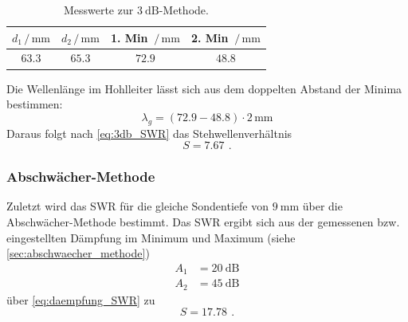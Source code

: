 \begin{table}
    \centering
    \caption{Messwerte zur $\SI{3}{\dB}$-Methode.}
    \label{tab:3db_methode}
    \begin{tabular}{c c c c}
        \toprule
        $d_1 \,/\, \si{\milli\metre}$ & $d_2 \,/\, \si{\milli\metre}$ & 1. Min $\,/\, \si{\milli\metre}$ & 2. Min $\,/\, \si{\milli\metre}$ \\
        \midrule
        $63.3$ & $65.3$ & $72.9$ & $48.8$ \\
        \bottomrule
    \end{tabular}
\end{table}
\FloatBarrier

Die Wellenlänge im Hohlleiter lässt sich aus dem doppelten Abstand der Minima bestimmen:
\begin{equation*}
    \lambda_g = (72.9 - 48.8) \cdot 2 \, \si{\milli\metre}
\end{equation*}
Daraus folgt nach \autoref{eq:3db_SWR} das Stehwellenverhältnis
\begin{equation}
    S = \SI{7.67}{} \, .
\end{equation}

\subsubsection{Abschwächer-Methode}
Zuletzt wird das SWR für die gleiche Sondentiefe von $\SI{9}{\milli\metre}$ über die Abschwächer-Methode bestimmt.
Das SWR ergibt sich aus der gemessenen bzw. eingestellten Dämpfung im Minimum und Maximum (siehe \autoref{sec:abschwaecher_methode})
\begin{align*}
    A_1 &= \SI{20}{\dB} \\
    A_2 &= \SI{45}{\dB}
\end{align*}
über \autoref{eq:daempfung_SWR} zu
\begin{equation}
    S = \SI{17.78}{} \, .
\end{equation}
